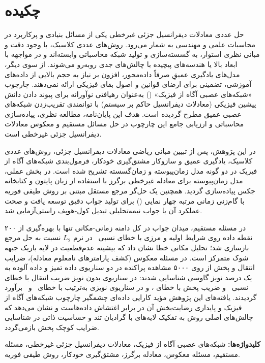 \chapter*{چکیده}
{}

حل عددی معادلات دیفرانسیل جزئی غیرخطی یکی از مسائل بنیادی و پرکاربرد در محاسبات علمی و مهندسی به شمار می‌رود. روش‌های عددی کلاسیک، با وجود دقت و مبانی نظری استوار، به گسسته‌سازی و تولید شبکه محاسباتی وابسته‌اند و در مواجهه با ابعاد بالا یا هندسه‌های پیچیده با چالش‌های جدی روبه‌رو می‌شوند. از سوی دیگر، مدل‌های یادگیری عمیقِ صرفاً داده‌محور، افزون بر نیاز به حجم بالایی از داده‌های آموزشی، تضمینی برای ارضای قوانین و اصول بقای فیزیکی ارائه نمی‌دهند. چارچوب «شبکه‌های عصبی آگاه از فیزیک» () به‌عنوان رهیافتی نوآورانه برای پیوند دادن دانش پیشین فیزیکی (معادلات دیفرانسیل حاکم بر سیستم) با توانمندی تقریب‌زدن شبکه‌های عصبی عمیق مطرح گردیده است. هدف این پایان‌نامه، مطالعه نظری، پیاده‌سازی محاسباتی و ارزیابی جامع این چارچوب در حل مسائل مستقیم و معکوس معادلات دیفرانسیل جزئی غیرخطی است.

در این پژوهش، پس از تبیین مبانی ریاضی معادلات دیفرانسیل جزئی، روش‌های عددی کلاسیک، یادگیری عمیق و سازوکار مشتق‌گیری خودکار، فرمول‌بندی شبکه‌های آگاه از فیزیک در دو گونه مدل زمان‌پیوسته و زمان‌گسسته تشریح شده است. در بخش عملی، مدل زمان‌پیوسته برای معادله غیرخطی برگرز با استفاده از زبان پایتون و کتابخانه جکس پیاده‌سازی گردید. همچنین یک حل‌گر مرجع مستقل مبتنی بر روش طیفی فوریه با گام‌زنی زمانی مرتبه چهار نمایی () برای تولید جواب دقیق توسعه یافت و صحت عملکرد آن با جواب نیمه‌تحلیلی تبدیل کول-هوپف راستی‌آزمایی شد.

در مسئله مستقیم، میدان جواب در کل دامنه زمانی-مکانی تنها با بهره‌گیری از ۲۰۰ نقطه داده روی شرایط اولیه و مرزی با خطای نسبی \FwdRelErr\ در نرم $L_2$ نسبت به حل مرجع بازسازی شد؛ تحلیل مکانی خطا نشان داد که بیشینه عدم‌قطعیت در لایه باریک جبهه شوک متمرکز است. در مسئله معکوس (کشف پارامترهای نامعلوم معادله)، ضرایب انتقال و پخش از روی ۵۰۰۰ مشاهده پراکنده در دو سناریوی داده تمیز و داده آلوده به یک درصد نویز گاوسی شناسایی شدند: در سناریوی بدون نویز ضریب انتقال با خطای نسبی \LamIErrClean\ و ضریب پخش با خطای \LamIIErrClean، و در سناریوی نویزی به‌ترتیب با خطای \LamIErrNoisy\ و \LamIIErrNoisy\ برآورد گردیدند. یافته‌های این پژوهش مؤید کارایی داده‌ای چشمگیر چارچوب شبکه‌های آگاه از فیزیک و پایداری رضایت‌بخش آن در برابر اغتشاش داده‌هاست و نشان می‌دهد که چالش‌های اصلی روش به تفکیک لایه‌های با گرادیان تند و حساسیت ذاتی در شناسایی ضرایب کوچک پخش بازمی‌گردد.

\textbf{کلیدواژه‌ها:} شبکه‌های عصبی آگاه از فیزیک، معادلات دیفرانسیل جزئی غیرخطی، مسئله مستقیم، مسئله معکوس، معادله برگرز، مشتق‌گیری خودکار، روش طیفی فوریه.
